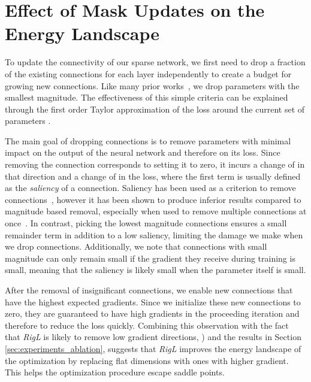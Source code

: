 \documentclass{article}
\begin{document}


\clearpage
\appendix

\section{Effect of Mask Updates on the Energy Landscape}
\label{app:losssurface}
To update the connectivity of our sparse network, we first need to drop a fraction  of the existing connections for each layer independently to create a budget for growing new connections. Like many prior works~\citep{Thimm95evaluatingpruning, sparse-connection-1997, exploring-sparsity-rnn, han2015learning}, we drop parameters with the smallest magnitude. The effectiveness of this simple criteria can be explained through the first order Taylor approximation of the loss  around the current set of parameters .



The main goal of dropping connections is to remove parameters with minimal impact on the output of the neural network and therefore on its loss. Since removing the connection  corresponds to setting it to zero, it incurs a change of  in that direction and a change of  in the loss, where the first term is usually defined as the {\em saliency} of a connection. Saliency has been used as a criterion to remove connections~\citep{pruning-convnet-nvidia}, however it has been shown to produce inferior results compared to magnitude based removal, especially when used to remove multiple connections at once~\citep{evci2018}. In contrast, picking the lowest magnitude connections ensures a small remainder term in addition to a low saliency, limiting the damage we make when we drop connections. Additionally, we note that connections with small magnitude can only remain small if the gradient they receive during training is small, meaning that the saliency is likely small when the parameter itself is small.

After the removal of insignificant connections, we enable new connections that have the highest expected gradients. Since we initialize these new connections to zero, they are guaranteed to have high gradients in the proceeding iteration and therefore to reduce the loss quickly.  Combining this observation with the fact that {\em RigL} is likely to remove low gradient directions, ) and the results in Section \ref{sec:experiments_ablation}, suggests that {\em RigL} improves the energy landscape of the optimization by replacing flat dimensions with ones with higher gradient. This helps the optimization procedure escape saddle points.
\end{document}
